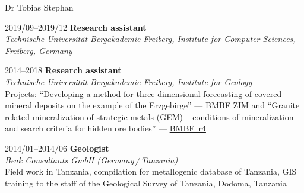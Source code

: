 \documentclass[10pt, paper=letter]{scrartcl} %
\begin{document}
\begin{cv}{\textsf{Dr Tobias Stephan}}
\begin{cvlist}{}
        \item[2019/09--2019/12] \textbf{Research assistant}\\
        \textit{Technische Universit\"at Bergakademie Freiberg, Institute for Computer Sciences, Freiberg, Germany}

        \item[2014--2018] \textbf{Research assistant}\\
        \textit{Technische Universit\"at Bergakademie Freiberg, Institute for Geology}
        \\ Projects: \enquote{Developing a method for three dimensional forecasting of covered mineral deposits on the example of the Erzgebirge} --- BMBF ZIM and \enquote{Granite related mineralization of strategic metals (GEM) – conditions of mineralization and search criteria for hidden ore bodies} --- \href{https://www.gfz-potsdam.de/en/section/inorganic-and-isotope-geochemistry/projects/prohydrogen-more-mofette-research-prosalz-gramm-sugar-gem-amrep-halmahera-gogaf-irup-spp-sample-ketzin-co2-cosanostra-inkaba-yeafrica-dafgas/gem/bmbf-r4-gem}{BMBF~r4}
        \item[2014/01--2014/06] \textbf{Geologist}\\
        \textit{Beak Consultants GmbH (Germany\,/\,Tanzania)}\\
        Field work in Tanzania, compilation for metallogenic database of Tanzania, GIS training to the staff of the Geological Survey of Tanzania, Dodoma, Tanzania

\end{cvlist}
\end{cv}
\end{document}
